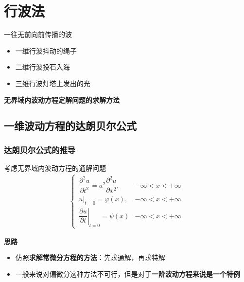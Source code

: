 \chapter{行波法}
\thispagestyle{empty}

\noindent {}\quad 一往无前向前传播的波
\begin{itemize}
	\item 一维行波\quad 抖动的绳子
	\item 二维行波\quad 投石入海
	\item 三维行波\quad 灯塔上发出的光
\end{itemize}
\noindent {}\quad \textbf{无界域内波动方程定解问题的求解方法}

\section{一维波动方程的达朗贝尔公式}
\subsection{达朗贝尔公式的推导}
考虑无界域内波动方程的通解问题
\begin{align}
	\begin{cases}
		\, \dfrac{\partial^2 u}{\partial t^2} = a^2 \dfrac{\partial^2 u}{\partial x^2}, & -\infty < x< +\infty\\[0.5em]
		\, u|_{t = 0} = \varphi(x), & -\infty < x< +\infty\\[0.5em]
		\, \left. \dfrac{\partial u}{\partial t} \right|_{t = 0} = \psi(x) & -\infty < x< +\infty
	\end{cases}
\end{align}

\noindent \textbf{思路}
\begin{itemize}
	\item 仿照\textbf{求解常微分方程的方法}：先求通解，再求特解
	\item 一般来说对偏微分这种方法不可行，但是对于\textbf{一阶波动方程来说是一个特例}
\end{itemize}

